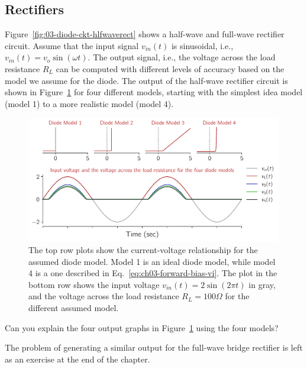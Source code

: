 \subsection{Rectifiers}
Figure~\ref{fig:03-diode-ckt-hlfwaverect} shows a half-wave and full-wave rectifier circuit. Assume that the input signal  $v_{in}\left(t\right)$ is sinusoidal, i.e., $v_{in}\left(t\right) = v_o \sin\left(\omega t\right)$. The output signal, i.e., the voltage across the load resistance $R_L$ can be computed with different levels of accuracy based on the model we assume for the diode. The output of the half-wave rectifier circuit is shown in Figure~\ref{fig:03-diode-halfwave-plot} for four different models, starting with the simplest idea model (model 1) to a more realistic model (model 4). 
\begin{figure}[t]
    \centering
    \includegraphics[width=\textwidth]{figures/ch03/fig03-diode-halfwave-plot.pdf}
    \caption{The top row plots show the current-voltage relationship for the assumed diode model. Model 1 is an ideal diode model, while model 4 is a one described in Eq.~\ref{eq:ch03-forward-bias-vi}. The plot in the bottom row shows the input voltage $v_{in}\left(t\right) = 2 \sin\left(2\pi t\right)$ in gray, and the voltage across the load resistance $R_L = 100\Omega$ for the different assumed model.}
    \label{fig:03-diode-halfwave-plot}
\end{figure}

\begin{boxedstuff}
    \begin{problem}
        Can you explain the four output graphs in Figure~\ref{fig:03-diode-halfwave-plot} using the four models?
    \end{problem}
\end{boxedstuff}
The problem of generating a similar output for the full-wave bridge rectifier is left as an exercise at the end of the chapter.

